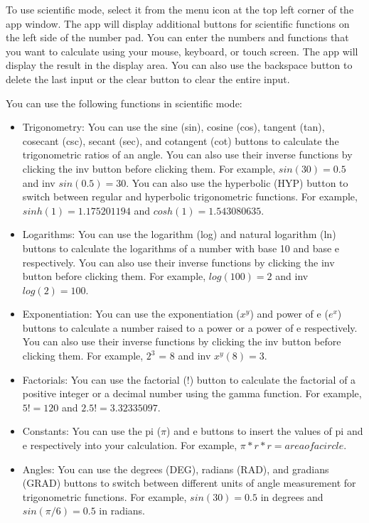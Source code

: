 \documentclass[12pt]{article}
\begin{document}
To use scientific mode, select it from the menu icon at the top left corner of the app window. The app will display additional buttons for scientific functions on the left side of the number pad. You can enter the numbers and functions that you want to calculate using your mouse, keyboard, or touch screen. The app will display the result in the display area. You can also use the backspace button to delete the last input or the clear button to clear the entire input.

You can use the following functions in scientific mode\cite{calculator-how-to-use}:

\begin{itemize}
    \item Trigonometry: You can use the sine (sin), cosine (cos), tangent (tan), cosecant (csc), secant (sec), and cotangent (cot) buttons to calculate the trigonometric ratios of an angle. You can also use their inverse functions by clicking the inv button before clicking them. For example, $sin(30) = 0.5$ and inv $sin(0.5) = 30$. You can also use the hyperbolic (HYP) button to switch between regular and hyperbolic trigonometric functions. For example, $sinh(1) = 1.175201194$ and $cosh(1) = 1.543080635$.
    \item Logarithms: You can use the logarithm (log) and natural logarithm (ln) buttons to calculate the logarithms of a number with base 10 and base e respectively. You can also use their inverse functions by clicking the inv button before clicking them. For example, $log(100) = 2$ and inv $log(2) = 100$.
    \item Exponentiation: You can use the exponentiation ($x^y$) and power of e ($e^x$) buttons to calculate a number raised to a power or a power of e respectively. You can also use their inverse functions by clicking the inv button before clicking them. For example, $2^3$ = 8 and inv $x^y(8) = 3$.
    \item Factorials: You can use the factorial (!) button to calculate the factorial of a positive integer or a decimal number using the gamma function. For example, $5! = 120$ and $2.5! = 3.32335097$.
    \item Constants: You can use the pi ($\pi$) and e buttons to insert the values of pi and e respectively into your calculation. For example, $\pi * r * r = area of a circle$.
    \item Angles: You can use the degrees (DEG), radians (RAD), and gradians (GRAD) buttons to switch between different units of angle measurement for trigonometric functions. For example, $sin(30) = 0.5$ in degrees and $sin(\pi/6) = 0.5$ in radians.

\end{itemize}
\end{document}
